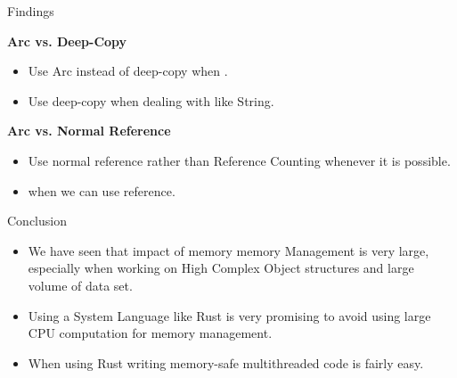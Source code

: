 \documentclass[9pt]{beamer}
\begin{document}

\begin{frame}[fragile]{Findings}

\textbf{Arc vs. Deep-Copy}

    \begin{itemize}
        \item Use Arc instead of deep-copy when .
        \item Use deep-copy when dealing with  like String.
    \end{itemize}

\textbf{Arc vs. Normal Reference}

    \begin{itemize}

        \item Use normal reference rather than Reference Counting whenever it is possible.
        \item {} when we can use reference.
    \end{itemize}
\end{frame}


\begin{frame}[fragile]{Conclusion}
    \begin{itemize}
        \item We have seen that impact of memory memory Management is very large, 
              especially when working on High Complex Object structures and large volume of data set. 

        \item Using a System Language like Rust is very promising to avoid using large CPU computation for memory management. 
        \item When using Rust writing memory-safe multithreaded code is fairly easy.
         
    \end{itemize}
\end{frame}
\end{document}
